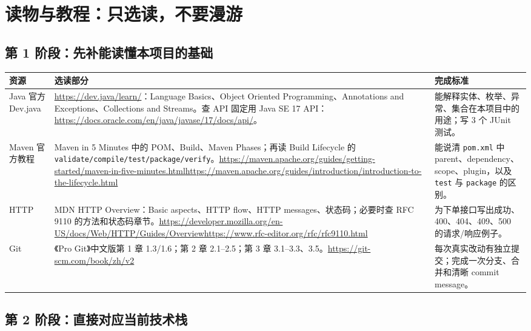 \documentclass[a4paper,11pt]{article}
\begin{document}
\section{读物与教程：只选读，不要漫游}

\subsection{第 1 阶段：先补能读懂本项目的基础}

\begin{longtable}{>{\raggedright\arraybackslash}p{} >{\raggedright\arraybackslash}p{} >{\raggedright\arraybackslash}p{}}
\textbf{资源} & \textbf{选读部分} & \textbf{完成标准} \\
\hline
Java 官方 Dev.java & \url{https://dev.java/learn/}：Language Basics、Object Oriented Programming、Annotations and Exceptions、Collections and Streams。查 API 固定用 Java SE 17 API：\url{https://docs.oracle.com/en/java/javase/17/docs/api/}。 & 能解释实体、枚举、异常、集合在本项目中的用途；写 3 个 JUnit 测试。 \\
Maven 官方教程 & Maven in 5 Minutes 中的 POM、Build、Maven Phases；再读 Build Lifecycle 的 \texttt{validate/compile/test/package/verify}。\newline \url{https://maven.apache.org/guides/getting-started/maven-in-five-minutes.html}\newline \url{https://maven.apache.org/guides/introduction/introduction-to-the-lifecycle.html} & 能说清 \texttt{pom.xml} 中 parent、dependency、scope、plugin，以及 \texttt{test} 与 \texttt{package} 的区别。 \\
HTTP & MDN HTTP Overview：Basic aspects、HTTP flow、HTTP messages、状态码；必要时查 RFC 9110 的方法和状态码章节。\newline \url{https://developer.mozilla.org/en-US/docs/Web/HTTP/Guides/Overview}\newline \url{https://www.rfc-editor.org/rfc/rfc9110.html} & 为下单接口写出成功、400、404、409、500 的请求/响应例子。 \\
Git & 《Pro Git》中文版第 1 章 1.3/1.6；第 2 章 2.1--2.5；第 3 章 3.1--3.3、3.5。\newline \url{https://git-scm.com/book/zh/v2} & 每次真实改动有独立提交；完成一次分支、合并和清晰 commit message。 \\
\end{longtable}

\subsection{第 2 阶段：直接对应当前技术栈}
\end{document}
